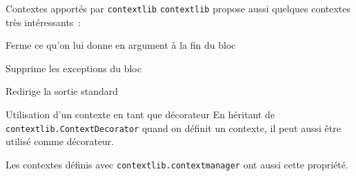 \begin{frame}{Contextes apportés par \texttt{contextlib}}
  \texttt{contextlib} propose aussi quelques contextes très intéressants~:
  \begin{description}[<+->]
    \item[\texttt{closing}] Ferme ce qu'on lui donne en argument à la fin du bloc
    \item[\texttt{suppress}] Supprime les exceptions du bloc
    \item[\texttt{redirect\_stdout}] Redirige la sortie standard
  \end{description}
\end{frame}

\begin{frame}{Utilisation d'un contexte en tant que décorateur}
  En héritant de \texttt{contextlib.ContextDecorator} quand on définit un contexte, il peut aussi être utilisé comme décorateur.

  Les contextes définis avec \texttt{contextlib.contextmanager} ont aussi cette propriété.
\end{frame}
